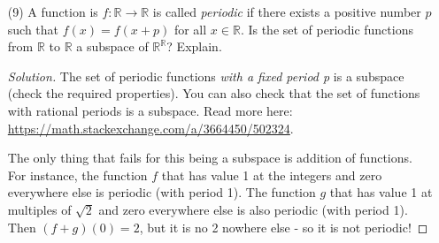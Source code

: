 \documentclass[a4paper,11pt]{article}
\theoremstyle{definition}
\newenvironment{solution}
  {\renewcommand\qedsymbol{$\blacksquare$}\begin{proof}[Solution]}
  {\end{proof}}
\begin{document}
\begin{enumerate}[(1)]
\begin{solution}
In (b), (c) and (d) you could find many reasons those sets are not subspaces, I will provide only one.
    \begin{enumerate}[(a)]
        \item.
        Elements of this set are of the form $(x,x)$ for $x\in\mathbb R$, and this is a subspace:
        \begin{enumerate}[(i)]
            \item
            Given two elements $(x,x)$ and $(y,y)$ in the subset, then their sum $(x,x)+(y,y) = (x+y,x+y)$ is still in the subset.
            \item 
            Given an element $(x,x)$ and a scalar $a\in\mathbb R$, the scaled vector $a\cdot (x,x) = (ax,ax)$ is still in the subset.
            \item 
            The zero vector $(0,0)$ is in the subset.
        \end{enumerate}
        \item 
        The vectors $(1,1)$ and $(4,2)$ are in the subset, but their sum $(1,1)+(4,2) = (5,3)$ is not.
        \item 
        The vector $(1,1)$ is in the subset, but $\sqrt 2\cdot (1,1) = (\sqrt 2, \sqrt 2)$ is not.
        \item 
        The vectors $(0,1)$ and $(1,1)$ are in the subset, but their sum $(0,1)+(1,1) = (1,2)$ is not.        
    \end{enumerate}
\end{solution}
\item [(9)]
A function is $f:\mathbb R\to\mathbb R$ is called \textit{periodic} if there exists a positive number $p$ such that $f(x) = f(x+p)$ for all $x\in\mathbb R$.
Is the set of periodic functions from $\mathbb R$ to $\mathbb R$ a subspace of $\mathbb R^\mathbb R$? Explain.
\begin{solution}
The set of periodic functions \textit{with a fixed period p} is a subspace (check the required properties).
You can also check that the set of functions with rational periods is a subspace.
Read more here: \url{https://math.stackexchange.com/a/3664450/502324}.

The only thing that fails for this being a subspace is addition of functions.
For instance, the function $f$ that has value 1 at the integers and zero everywhere else is periodic (with period 1).
The function $g$ that has value 1 at multiples of $\sqrt 2$ and zero everywhere else is also periodic (with period 1).
Then $(f+g)(0) = 2$, but it is no 2 nowhere else - so it is not periodic!


\end{solution}
\end{enumerate}
\end{document}
